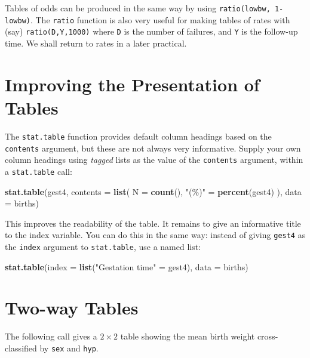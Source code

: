 \documentclass[
]{book}
\newenvironment{Shaded}{\begin{snugshade}}{\end{snugshade}}
\newcommand{\AttributeTok}[1]{\textcolor[rgb]{0.13,0.29,0.53}{#1}}
\newcommand{\FunctionTok}[1]{\textcolor[rgb]{0.13,0.29,0.53}{\textbf{#1}}}
\newcommand{\NormalTok}[1]{#1}
\newcommand{\OtherTok}[1]{\textcolor[rgb]{0.56,0.35,0.01}{#1}}
\newcommand{\StringTok}[1]{\textcolor[rgb]{0.31,0.60,0.02}{#1}}
\begin{document}
Tables of odds can be produced in the same way by using
\texttt{ratio(lowbw,\ 1-lowbw)}. The \texttt{ratio} function is also very useful
for making tables of rates with (say) \texttt{ratio(D,Y,1000)} where
\texttt{D} is the number of failures, and \texttt{Y} is the follow-up time. We
shall return to rates in a later practical.

\section{Improving the Presentation of Tables}\label{improving-the-presentation-of-tables}

The \texttt{stat.table} function provides default column headings based
on the \texttt{contents} argument, but these are not always very informative.
Supply your own column headings using \emph{tagged} lists as the
value of the \texttt{contents} argument, within a \texttt{stat.table} call:

\begin{Shaded}
\begin{Highlighting}[]
\FunctionTok{stat.table}\NormalTok{(gest4, }\AttributeTok{contents =} \FunctionTok{list}\NormalTok{(}
  \AttributeTok{N =} \FunctionTok{count}\NormalTok{(),}
  \StringTok{"(\%)"} \OtherTok{=} \FunctionTok{percent}\NormalTok{(gest4)}
\NormalTok{), }\AttributeTok{data =}\NormalTok{ births)}
\end{Highlighting}
\end{Shaded}

This improves the readability of the table. It remains to give an
informative title to the index variable. You can do this in the same way:
instead of giving \texttt{gest4} as the \texttt{index} argument to \texttt{stat.table},
use a named list:

\begin{Shaded}
\begin{Highlighting}[]
\FunctionTok{stat.table}\NormalTok{(}\AttributeTok{index =} \FunctionTok{list}\NormalTok{(}\StringTok{"Gestation time"} \OtherTok{=}\NormalTok{ gest4), }\AttributeTok{data =}\NormalTok{ births)}
\end{Highlighting}
\end{Shaded}

\section{Two-way Tables}\label{two-way-tables}

The following call gives a \(2\times 2\) table showing the mean birth weight
cross-classified by \texttt{sex} and \texttt{hyp}.
\end{document}

